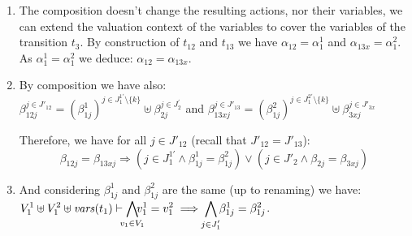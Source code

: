 \documentclass[runningheads]{llncs}
\begin{document}
\begin{enumerate}
\begin{enumerate}
\item The composition doesn't change the resulting actions, nor their variables, we can extend the valuation context of the variables to cover the variables of the transition $t_3$.   By construction of  $t_{12}$ and $t_{13}$ we have $\alpha_{12}=
\alpha^1_{1}$ and $\alpha_{13x}=\alpha^2_{1}$. As  $\alpha^1_{1}=\alpha^2_{1}$  we deduce: 
$\alpha_{12} = \alpha_{13x}$. 
\item By composition we have also:\\
 $\beta_{12j}^{j\in J'_{12}}= {({\beta^1_{1j}})^{j \in J^{1 \prime}_1 \setminus \{k\}} \uplus  {\beta_{2j}^{j \in J^{\prime}_2} }}$ and $\beta_{13xj}^{j\in J'_{13}}= {{(\beta^2_{1j})^{j \in {J^{2 \prime}_1} \setminus \{k\}}}\uplus \beta_{3xj}^{j \in J'_{3x} } }$

Therefore, we have for all $j\in J'_{12}$ (recall that $J'_{12}=J'_{13}$):  
\[\beta_{12j} = \beta_{13xj} \Rightarrow (j\in J^{1 \prime}_1 \land \beta^1_{1j}= \beta^2_{1j}) \vee  (j\in J'_2 \land \beta_{2j} = \beta_{3xj})  \]

\item And considering $\beta^1_{1j}$ and  $\beta^2_{1j}$  are the same (up to renaming)  we have: 
${\displaystyle V^1_{1} \uplus V^2_{1} \uplus \fvars{t_{1}} \vdash \bigwedge_\subbox{v_1\in V_1}\!\! v^1_1=v^2_1\implies \bigwedge_\subbox{j \in J^{\prime}_1} \beta^1_{1j}= \beta^2_{1j}}$.


\end{enumerate}
\end{enumerate}
\end{document}
